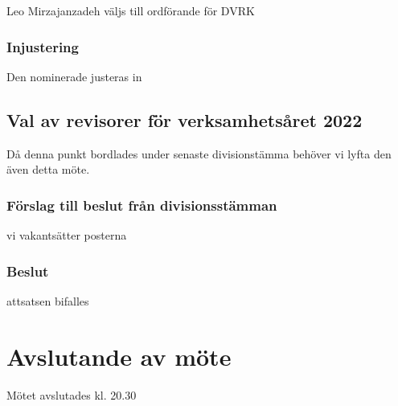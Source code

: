 \documentclass[protokoll]{dvd}
\begin{document}
        \begin{attsatser}
            \item Leo Mirzajanzadeh väljs till ordförande för DVRK
        \end{attsatser}

    \subsubsection*{Injustering}
    Den nominerade justeras in

\subsection{Val av revisorer för verksamhetsåret 2022}
Då denna punkt bordlades under senaste divisionstämma behöver vi lyfta den även detta möte.

\subsubsection*{Förslag till beslut från divisionsstämman}

\begin{attsatser}
    \item vi vakantsätter posterna
\end{attsatser}

\subsubsection*{Beslut}
\begin{attsatser}
    \item attsatsen bifalles
\end{attsatser}


\section{Avslutande av möte}

Mötet avslutades kl. 20.30

\end{document}
